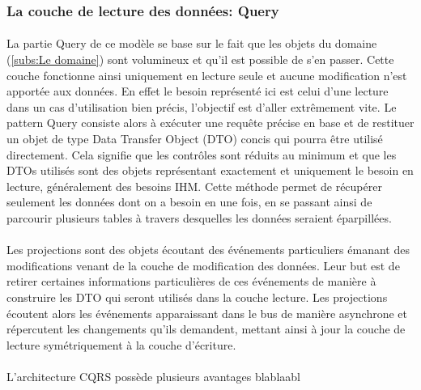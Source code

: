 \subsubsection{La couche de lecture des données: Query}
\label{subs:La couche de lecture des données: Query}
\paragraph{}
La partie Query de ce modèle se base sur le fait que les objets du domaine (\ref{subs:Le domaine}) sont volumineux et qu'il est possible de s'en passer.
Cette couche fonctionne ainsi uniquement en lecture seule et aucune modification n'est apportée aux données.
En effet le besoin représenté ici est celui d'une lecture dans un cas d'utilisation bien précis, l'objectif est d'aller extrêmement vite.
Le pattern Query consiste alors à exécuter une requête précise en base et de restituer un objet de type Data Transfer Object (DTO) concis qui pourra être utilisé directement.
Cela signifie que les contrôles sont réduits au minimum et que les DTOs utilisés sont des objets représentant exactement et uniquement le besoin en lecture, généralement des besoins IHM.
Cette méthode permet de récupérer seulement les données dont on a besoin en une fois, en se passant ainsi de parcourir plusieurs tables à travers desquelles les données seraient éparpillées.
\paragraph{}
Les projections sont des objets écoutant des événements particuliers émanant des modifications venant de la couche de modification des données.
Leur but est de retirer certaines informations particulières de ces événements de manière à construire les DTO qui seront utilisés dans la couche lecture.
Les projections écoutent alors les événements apparaissant dans le bus de manière asynchrone et répercutent les changements qu'ils demandent, mettant ainsi à jour la couche de lecture symétriquement à la couche d'écriture.

\paragraph{}
\label{par:Organisation conclusion}
L'architecture CQRS possède plusieurs avantages blablaabl
